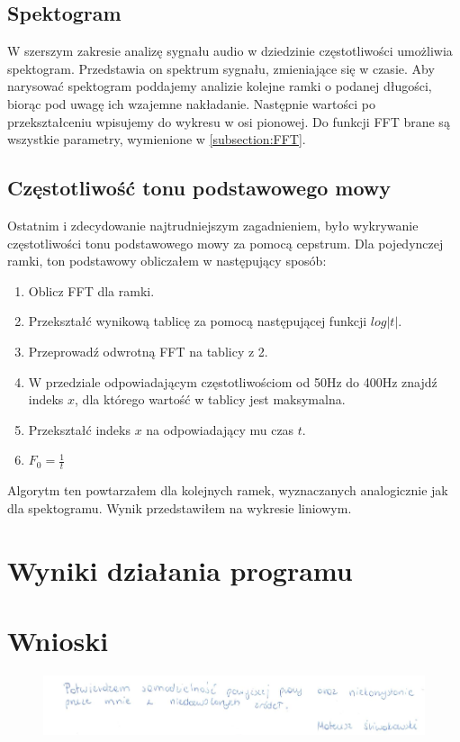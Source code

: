 \documentclass{article}
\begin{document}
\subsection{Spektogram}

W szerszym zakresie analizę sygnału audio w dziedzinie częstotliwości umożliwia spektogram. Przedstawia on spektrum sygnału, zmieniające się w czasie. Aby narysować spektogram poddajemy analizie kolejne ramki o podanej długości, biorąc pod uwagę ich wzajemne nakładanie. Następnie wartości po przekształceniu wpisujemy do wykresu w osi pionowej. Do funkcji FFT brane są wszystkie parametry, wymienione w \ref{subsection:FFT}.

\subsection{Częstotliwość tonu podstawowego mowy}

Ostatnim i zdecydowanie najtrudniejszym zagadnieniem, było wykrywanie częstotliwości tonu podstawowego mowy za pomocą cepstrum. Dla pojedynczej ramki, ton podstawowy obliczałem w następujący sposób:
\begin{enumerate}
\item Oblicz FFT dla ramki.
\item Przekształć wynikową tablicę za pomocą następującej funkcji $log|t|$.
\item Przeprowadź odwrotną FFT na tablicy z 2.
\item W przedziale odpowiadającym częstotliwościom od 50Hz do 400Hz znajdź indeks $x$, dla którego wartość w tablicy jest maksymalna.
\item Przekształć indeks $x$ na odpowiadający mu czas $t$.
\item $F_0 = \frac{1}{t}$
\end{enumerate}

Algorytm ten powtarzałem dla kolejnych ramek, wyznaczanych analogicznie jak dla spektogramu. Wynik przedstawiłem na wykresie liniowym.

\section{Wyniki działania programu}


\section{Wnioski}

\begin{figure}[b]
\centering
\includegraphics[width=5in]{bottom.png}
\end{figure}
\end{document}
